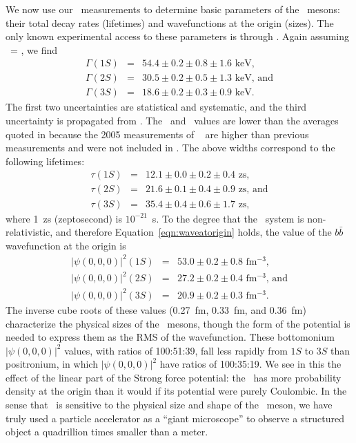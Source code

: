\documentclass{cornell}
\begin{document}
We now use our \gee\ measurements to determine basic parameters of the
\ups\ mesons: their total decay rates (lifetimes) and wavefunctions at
the origin (sizes).  The only known experimental access to these
parameters is through \gee.  Again assuming \bee\ = \bmm, we find
\begin{eqnarray}
  \Gamma(1S) &=& 54.4 \pm 0.2 \pm 0.8 \pm 1.6 \mbox{ keV,} \\
  \Gamma(2S) &=& 30.5 \pm 0.2 \pm 0.5 \pm 1.3 \mbox{ keV, and} \\
  \Gamma(3S) &=& 18.6 \pm 0.2 \pm 0.3 \pm 0.9 \mbox{ keV.}
\end{eqnarray}
The first two uncertainties are statistical and systematic, and the
third uncertainty is propagated from \bmm.  The \uss\ and \usss\
values are lower than the averages quoted in \cite{pdg} because the
2005 measurements of \bmm\ \cite{istvan} are higher than previous
measurements and were not included in \cite{pdg}.  The above widths
correspond to the following lifetimes:
\begin{eqnarray}
  \tau(1S) &=& 12.1 \pm 0.0 \pm 0.2 \pm 0.4 \mbox{ zs,} \\
  \tau(2S) &=& 21.6 \pm 0.1 \pm 0.4 \pm 0.9 \mbox{ zs, and} \\
  \tau(3S) &=& 35.4 \pm 0.4 \pm 0.6 \pm 1.7 \mbox{ zs,}
\end{eqnarray}
where 1~zs (zeptosecond) is $10^{-21}$~s.
To the degree that the \ups\ system is non-relativistic, and therefore
Equation~\ref{eqn:waveatorigin} holds,
the value of the $b\bar{b}$ wavefunction at the origin is
\begin{eqnarray}
  |\psi(0,0,0)|^2(1S) &=& 53.0 \pm 0.2 \pm 0.8 \mbox{ fm$^{-3}$,} \\
  |\psi(0,0,0)|^2(2S) &=& 27.2 \pm 0.2 \pm 0.4 \mbox{ fm$^{-3}$, and} \\
  |\psi(0,0,0)|^2(3S) &=& 20.9 \pm 0.2 \pm 0.3 \mbox{ fm$^{-3}$.}
\end{eqnarray}
The inverse cube roots of these values (0.27~fm, 0.33~fm, and 0.36~fm)
characterize the physical sizes of the \ups\ mesons, though the form
of the potential is needed to express them as the RMS of the
wavefunction.  These bottomonium $|\psi(0,0,0)|^2$ values, with ratios
of 100:51:39, fall less rapidly from $1S$ to $3S$ than positronium, in
which $|\psi(0,0,0)|^2$ have ratios of 100:35:19.  We see in this
the effect of the linear part of the Strong force potential: the
\usss\ has more probability density at the origin than it would if its
potential were purely Coulombic.  In the sense that \gee\ is sensitive
to the physical size and shape of the \ups\ meson, we have truly used
a particle accelerator as a ``giant microscope'' to observe a
structured object a quadrillion times smaller than a meter.
\end{document}
